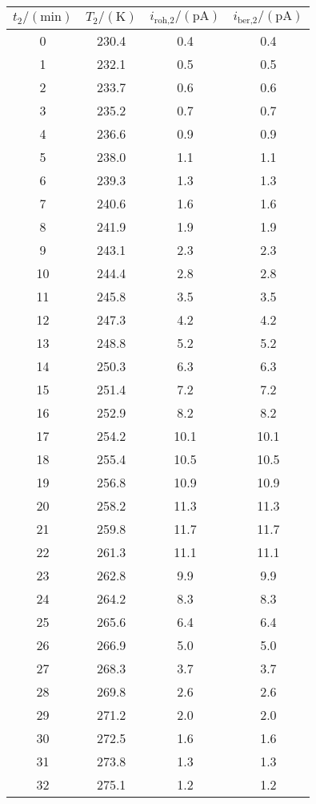 \label{tab:tabData2}
	\begin{tabular}{S[table-format=2.0]S[table-format=3.1]S[table-format=2.1]S[table-format=2.1]}
		\toprule
		{$t_\text{2}/(\si{\minute})$} & {$T_\text{2}/(\si{\kelvin})$} & {$i_\text{roh,2}/(\si{\pico\ampere})$} & {$i_\text{ber,2}/(\si{\pico\ampere})$} \\
		 & 230.4 & 0.4 & 0.4 \\
		 1 & 232.1 & 0.5 & 0.5 \\
		 2 & 233.7 & 0.6 & 0.6 \\
		 3 & 235.2 & 0.7 & 0.7 \\
		 4 & 236.6 & 0.9 & 0.9 \\
		 5 & 238.0 & 1.1 & 1.1 \\
		 6 & 239.3 & 1.3 & 1.3 \\
		 7 & 240.6 & 1.6 & 1.6 \\
		 8 & 241.9 & 1.9 & 1.9 \\
		 9 & 243.1 & 2.3 & 2.3 \\
		10 & 244.4 & 2.8 & 2.8 \\
		11 & 245.8 & 3.5 & 3.5 \\
		12 & 247.3 & 4.2 & 4.2 \\
		13 & 248.8 & 5.2 & 5.2 \\
		14 & 250.3 & 6.3 & 6.3 \\
		15 & 251.4 & 7.2 & 7.2 \\
		16 & 252.9 & 8.2 & 8.2 \\
		17 & 254.2 & 10.1 & 10.1 \\
		18 & 255.4 & 10.5 & 10.5 \\
		19 & 256.8 & 10.9 & 10.9 \\
		20 & 258.2 & 11.3 & 11.3 \\
		21 & 259.8 & 11.7 & 11.7 \\
		22 & 261.3 & 11.1 & 11.1 \\
		23 & 262.8 & 9.9 & 9.9 \\
		24 & 264.2 & 8.3 & 8.3 \\
		25 & 265.6 & 6.4 & 6.4 \\
		26 & 266.9 & 5.0 & 5.0 \\
		27 & 268.3 & 3.7 & 3.7 \\
		28 & 269.8 & 2.6 & 2.6 \\
		29 & 271.2 & 2.0 & 2.0 \\
		30 & 272.5 & 1.6 & 1.6 \\
		31 & 273.8 & 1.3 & 1.3 \\
		32 & 275.1 & 1.2 & 1.2 \\

\end{tabular}
